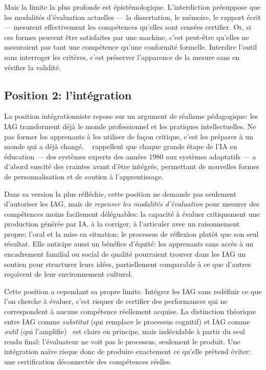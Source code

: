 Mais la limite la plus profonde est épistémologique. 
L'interdiction présuppose que les modalités d'évaluation actuelles --- la dissertation, le mémoire, le rapport écrit --- mesurent effectivement les compétences qu'elles sont censées certifier. 
Or, si ces formes peuvent être satisfaites par une machine, c'est peut-être qu'elles ne mesuraient pas tant une compétence qu'une conformité formelle.
Interdire l'outil sans interroger les critères, c'est préserver l'apparence de la mesure sans en vérifier la validité.

\subsection*{Position 2: l'intégration}

La position intégrationniste repose sur un argument de réalisme pédagogique: les IAG transforment déjà le monde professionnel et les pratiques intellectuelles. 
Ne pas former les apprenants à les utiliser de façon critique, c'est les préparer à un monde qui a déjà changé.%
~\cite{siham2024intelligence} rappellent que chaque grande étape de l'IA en éducation --- des systèmes experts des années 1980 aux systèmes adaptatifs --- a d'abord suscité des craintes avant d'être intégrée, permettant de nouvelles formes de personnalisation et de soutien à l'apprentissage.

Dans sa version la plus réfléchie, cette position ne demande pas seulement d'autoriser les IAG, mais de \emph{repenser les modalités d'évaluation} pour mesurer des compétences moins facilement déléguables: la capacité à évaluer critiquement une production générée par IA, à la corriger, à l'articuler avec un raisonnement propre; l'oral et la mise en situation; le processus de réflexion plutôt que son seul résultat.
Elle anticipe aussi un bénéfice d'équité: les apprenants sans accès à un encadrement familial ou social de qualité pourraient trouver dans les IAG un soutien pour structurer leurs idées, partiellement comparable à ce que d'autres reçoivent de leur environnement culturel.

Cette position a cependant sa propre limite. 
Intégrer les IAG sans redéfinir ce que l'on cherche à évaluer, c'est risquer de certifier des performances qui ne correspondent à aucune compétence réellement acquise. 
La distinction théorique entre IAG comme \emph{substitut} (qui remplace le processus cognitif) et IAG comme \emph{outil} (qui l'amplifie)~\citep{shiohira2021comprendre} est claire en principe, mais indécidable à partir du seul rendu final: l'évaluateur ne voit pas le processus, seulement le produit. 
Une intégration naïve risque donc de produire exactement ce qu'elle prétend éviter: une certification déconnectée des compétences réelles.

